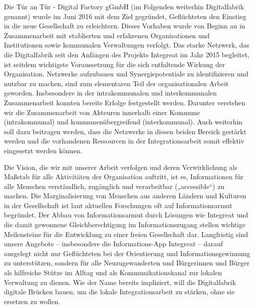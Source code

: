 \documentclass[12pt, a4paper]{article} %
\begin{document}
Die Tür an Tür - Digital Factory gGmbH (im Folgenden weiterhin
Digitalfabrik genannt) wurde im Juni 2016 mit dem Ziel gegründet,
Geflüchteten den Einstieg in die neue Gesellschaft zu erleichtern.
Dieses Vorhaben wurde von Beginn an in Zusammenarbeit mit etablierten
und erfahrenen Organisationen und Institutionen sowie kommunalen
Verwaltungen verfolgt. Das starke Netzwerk, das die Digitalfabrik seit
den Anfängen des Projekts Integreat im Jahr 2015 begleitet, ist seitdem
wichtigste Voraussetzung für die sich entfaltende Wirkung der
Organisation. Netzwerke aufzubauen und Synergiepotentiale zu
identifizieren und nutzbar zu machen, sind zum elementaren Teil der
organisationalen Arbeit geworden. Insbesondere in der intrakommunalen
und interkommunalen Zusammenarbeit konnten bereits Erfolge festgestellt
werden. Darunter verstehen wir die Zusammenarbeit von Akteuren innerhalb
einer Kommune (intrakommunal) und kommunenübergreifend (interkommunal).
Auch weiterhin soll dazu beitragen werden, dass die Netzwerke in diesen
beiden Bereich gestärkt werden und die vorhandenen Ressourcen in der
Integrationsarbeit somit effektiv eingesetzt werden können.

Die Vision, die wir mit unserer Arbeit verfolgen und deren
Verwirklichung als Maßstab für alle Aktivitäten der Organisation
auftritt, ist es, Informationen für alle Menschen verständlich,
zugänglich und verarbeitbar („accessible“) zu machen. Die
Marginalisierung von Menschen aus anderen Ländern und Kulturen in der
Gesellschaft ist laut aktuellen Forschungen oft auf Informationsarmut
begründet. Der Abbau von Informationsarmut durch Lösungen wie Integreat
und die damit gewonnene Gleichberechtigung im Informationszugang stellen
wichtige Meilensteine für die Entwicklung zu einer freien Gesellschaft
dar. Langfristig sind unsere Angebote – insbesondere die
Informations-App Integreat – darauf ausgelegt nicht nur Geflüchteten bei
der Orientierung und Informationsgewinnung zu unterstützen, sondern für
alle Neuzugewanderten und Bürgerinnen und Bürger als hilfreiche Stütze
im Alltag und als Kommunikationskanal zur lokalen Verwaltung zu dienen.
Wie der Name bereits impliziert, will die Digitalfabrik digitale Brücken
bauen, um die lokale Integrationsarbeit zu stärken, ohne sie ersetzen zu
wollen.
\end{document}
